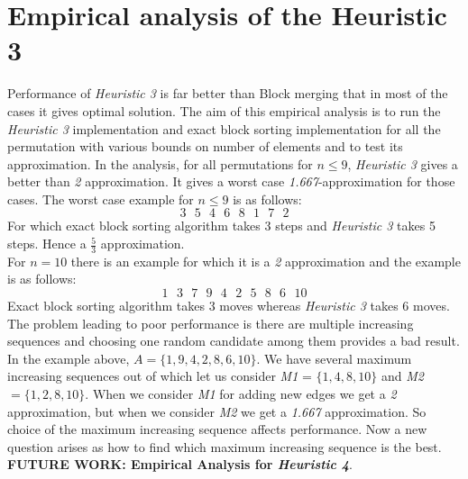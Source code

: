 \documentclass[BTech]{iitmdiss}
\begin{document}
\section{Empirical analysis of the Heuristic 3}
Performance of \textit{Heuristic 3} is far better than Block merging that in most of the cases it gives optimal solution. The aim of this empirical analysis is to run the \textit{Heuristic 3} implementation and exact block sorting implementation for all the permutation with various bounds on number of elements and to test its approximation. In the analysis, for all permutations for $n \leq 9$, \textit{Heuristic 3} gives a better than \textit{2} approximation. It gives a worst case \textit{1.667}-approximation for those cases. The worst case example for $n\leq 9$ is as follows:
$$3\text{ } 5\text{ } 4\text{ } 6\text{ } 8\text{ } 1\text{ } 7\text{ } 2$$
For which exact block sorting algorithm takes 3 steps and \textit{Heuristic 3} takes 5 steps. Hence a $\frac{5}{3}$ approximation.\\
For $n=10$ there is an example for which it is a \textit{2} approximation and the example is as follows:
$$1\text{ } 3\text{ } 7\text{ } 9\text{ } 4\text{ } 2\text{ } 5\text{ } 8\text{ } 6\text{ } 10$$
Exact block sorting algorithm takes 3 moves whereas \textit{Heuristic 3} takes 6 moves. The problem leading to poor performance is there are multiple increasing sequences and choosing one random candidate among them provides a bad result. In the example above, $A = \{1,9,4,2,8,6,10\}$. We have several maximum increasing sequences out of which let us consider \textit{M1} = $\{1,4,8,10\}$ and \textit{M2} $= \{1,2,8,10\}$. When we consider \textit{M1} for adding new edges we get a \textit{2} approximation, but when we consider \textit{M2} we get a \textit{1.667} approximation. So choice of the maximum increasing sequence affects performance. Now a new question arises as how to find which maximum increasing sequence is the best.\\
\textbf{FUTURE WORK: Empirical Analysis for \textit{Heuristic 4}}.      





\begin{singlespace}
  
\end{singlespace}




\end{document}
